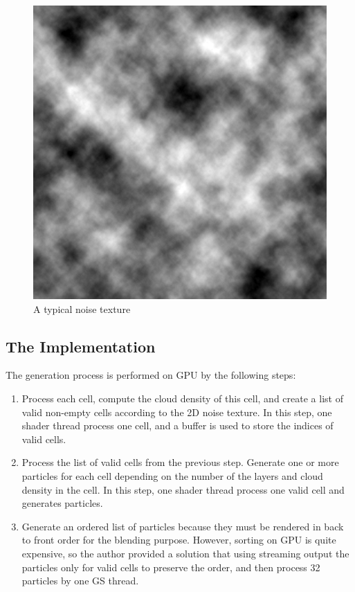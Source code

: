 \begin{figure}[htp]
\begin{center}
\includegraphics[scale=0.1]{images/Noise.png}
\caption{A typical noise texture}
\label{f10}
\end{center}
\end{figure}

\subsection{The Implementation}
The generation process is performed on GPU by the following steps:
\begin{enumerate}
\item Process each cell, compute the cloud density of this cell, and create a list of valid non-empty cells according to the 2D noise texture. In this step, one shader thread process one cell, and a buffer is used to store the indices of valid cells.
\item Process the list of valid cells from the previous step. Generate one or more particles for each cell depending on the number of the layers and cloud density in the cell. In this step, one shader thread process one valid cell and generates particles.
\item Generate an ordered list of particles because they must be rendered in back to front order for the blending purpose. However, sorting on GPU is quite expensive, so the author provided a solution that using streaming output the particles only for valid cells to preserve the order, and then process 32 particles by one GS thread.
\end{enumerate}
